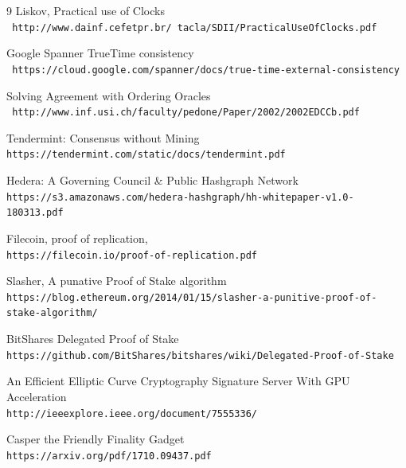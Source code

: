 \documentclass[12pt]{ltjsarticle}
\begin{document}
\begin{thebibliography}{9}
Liskov, Practical use of Clocks
\\\texttt{ http://www.dainf.cefetpr.br/~tacla/SDII/PracticalUseOfClocks.pdf}

Google Spanner TrueTime consistency
\\\texttt{ https://cloud.google.com/spanner/docs/true-time-external-consistency}

Solving Agreement with Ordering Oracles
\\\texttt{ http://www.inf.usi.ch/faculty/pedone/Paper/2002/2002EDCCb.pdf}

Tendermint: Consensus without Mining
\\\texttt{https://tendermint.com/static/docs/tendermint.pdf}

Hedera: A Governing Council \& Public Hashgraph Network
\\\texttt{https://s3.amazonaws.com/hedera-hashgraph/hh-whitepaper-v1.0-180313.pdf}

Filecoin, proof of replication,
\\\texttt{https://filecoin.io/proof-of-replication.pdf}

Slasher, A punative Proof of Stake algorithm
\\\texttt{https://blog.ethereum.org/2014/01/15/slasher-a-punitive-proof-of-stake-algorithm/}

BitShares Delegated Proof of Stake
\\\texttt{https://github.com/BitShares/bitshares/wiki/Delegated-Proof-of-Stake}

An Efficient Elliptic Curve Cryptography Signature Server With GPU Acceleration
\\\texttt{http://ieeexplore.ieee.org/document/7555336/}

Casper the Friendly Finality Gadget
\\\texttt{https://arxiv.org/pdf/1710.09437.pdf}
\end{thebibliography}
\end{document}
